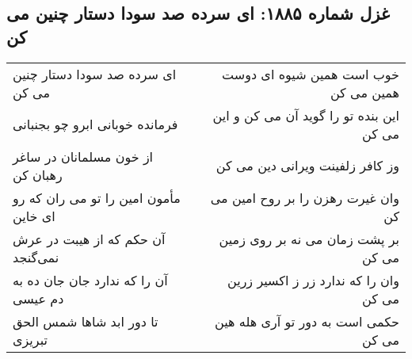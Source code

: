 \begin{center}
\section*{غزل شماره ۱۸۸۵: ای سرده صد سودا دستار چنین می کن}
\label{sec:1885}
\begin{longtable}{l p{0.5cm} r}
ای سرده صد سودا دستار چنین می کن
&&
خوب است همین شیوه ای دوست همین می کن
\\
فرمانده خوبانی ابرو چو بجنبانی
&&
این بنده تو را گوید آن می کن و این می کن
\\
از خون مسلمانان در ساغر رهبان کن
&&
وز کافر زلفینت ویرانی دین می کن
\\
مأمون امین را تو می ران که رو ای خاین
&&
وان غیرت رهزن را بر روح امین می کن
\\
آن حکم که از هیبت در عرش نمی‌گنجد
&&
بر پشت زمان می نه بر روی زمین می کن
\\
آن را که ندارد جان جان ده به دم عیسی
&&
وان را که ندارد زر ز اکسیر زرین می کن
\\
تا دور ابد شاها شمس الحق تبریزی
&&
حکمی است به دور تو آری هله هین می کن
\\
\end{longtable}
\end{center}
